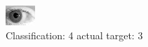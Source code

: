 \begin{figure}[h!]
\begin{center}
\includegraphics[width=0.60\columnwidth]{figures/ID214_class_4_target_3.png}
\end{center}
\caption{ Classification: 4 actual target: 3}
\label{fig:ID214_class_4_target_3}
\end{figure}
